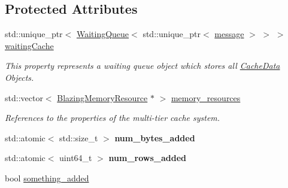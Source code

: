 \subsection*{Protected Attributes}
\begin{DoxyCompactItemize}
\item 
\mbox{\label{classral_1_1cache_1_1CacheMachine_a8398587447e7f6c2d7b44c326f6db510}} 
std\+::unique\+\_\+ptr$<$ \hyperlink{classral_1_1cache_1_1WaitingQueue}{Waiting\+Queue}$<$ std\+::unique\+\_\+ptr$<$ \hyperlink{classral_1_1cache_1_1message}{message} $>$ $>$ $>$ \hyperlink{classral_1_1cache_1_1CacheMachine_a8398587447e7f6c2d7b44c326f6db510}{waiting\+Cache}
\begin{DoxyCompactList}\small\item\em This property represents a waiting queue object which stores all \hyperlink{classral_1_1cache_1_1CacheData}{Cache\+Data} Objects. \end{DoxyCompactList}\item 
\mbox{\label{classral_1_1cache_1_1CacheMachine_adbc5d071b12e736d653d09ea91bfa418}} 
std\+::vector$<$ \hyperlink{classBlazingMemoryResource}{Blazing\+Memory\+Resource} $\ast$ $>$ \hyperlink{classral_1_1cache_1_1CacheMachine_adbc5d071b12e736d653d09ea91bfa418}{memory\+\_\+resources}
\begin{DoxyCompactList}\small\item\em References to the properties of the multi-\/tier cache system. \end{DoxyCompactList}\item 
\mbox{\label{classral_1_1cache_1_1CacheMachine_af4310e1a7fef8cce3300c5c092fcb4b4}} 
std\+::atomic$<$ std\+::size\+\_\+t $>$ {\bfseries num\+\_\+bytes\+\_\+added}
\item 
\mbox{\label{classral_1_1cache_1_1CacheMachine_aa051863db9e236e635602323453f4be8}} 
std\+::atomic$<$ uint64\+\_\+t $>$ {\bfseries num\+\_\+rows\+\_\+added}
\item 
\mbox{\label{classral_1_1cache_1_1CacheMachine_a9c85a6cd94a0f5a5f27a3e4d4fb9f7de}} 
bool \hyperlink{classral_1_1cache_1_1CacheMachine_a9c85a6cd94a0f5a5f27a3e4d4fb9f7de}{something\+\_\+added}

\end{DoxyCompactItemize}
